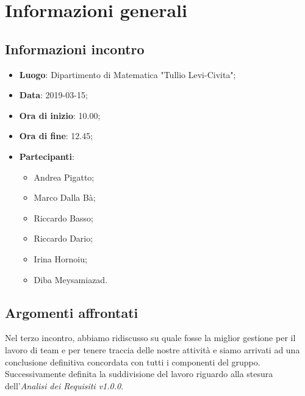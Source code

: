 \section{Informazioni generali}

\subsection{Informazioni incontro}
\begin{itemize}
\item \textbf{Luogo}: Dipartimento di Matematica "Tullio Levi-Civita";
\item \textbf{Data}: 2019-03-15;
\item \textbf{Ora di inizio}: 10.00;
\item \textbf{Ora di fine}: 12.45;
\item \textbf{Partecipanti}: 
\begin{itemize}
	\item Andrea Pigatto;
	\item Marco Dalla Bà;
	\item Riccardo Basso;
	\item Riccardo Dario;
	\item Irina Hornoiu;
	\item Diba Meysamiazad.
\end{itemize}
\end{itemize}

\subsection{Argomenti affrontati}
Nel terzo incontro, abbiamo ridiscusso su quale fosse la miglior gestione per il lavoro di team e per tenere traccia delle nostre attività e siamo arrivati ad una conclusione definitiva concordata con tutti i componenti del gruppo. Successivamente definita la suddivisione del lavoro riguardo alla stesura dell'\textit{Analisi dei Requisiti v1.0.0}.
